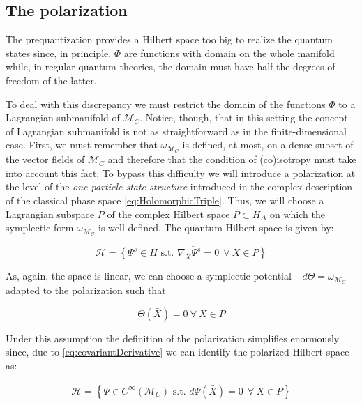 \documentclass[12pt]{article}%
\begin{document}
\subsection{The polarization}

The prequantization provides a Hilbert space too big to realize the quantum states since, in principle, $\Phi$ are functions with domain on the whole manifold while, in regular quantum theories, the domain must have half the degrees of freedom of the latter. 

To deal with this discrepancy we must restrict the domain of the functions $\Phi$ to a Lagrangian submanifold of $\mathcal{M}_{C}$. Notice, though, that in this setting the concept of Lagrangian submanifold is not as straightforward as in the finite-dimensional  case. First, we must remember that $\omega_{\mathcal{M}_C}$ is defined, at most, on a dense subset of the vector fields of  $\mathcal{M}_{C}$ and therefore that the condition of (co)isotropy must take into account this fact. 
 To bypass this difficulty we will introduce a polarization at the level of the \textit{one particle state structure} introduced in the complex description of the classical phase space \eqref{eq:HolomorphicTriple}. Thus, we will choose a Lagrangian subspace $P$ of the complex Hilbert space $P\subset H_{\Delta}$ on which the  symplectic form $\omega_{\mathcal{M}_C}$ is well defined. The quantum Hilbert space is given by:
 
 \begin{equation}
 \label{eq:ponarizedHilbert}
 \mathcal{H}=\overline{\left\{ \Psi^s \in H \textrm{ s.t. } \nabla_{\bar{X}}\Psi^s =0 \ \  \forall\  X\in P\right\}}
 \end{equation}

As, again, the space is linear, we can choose a symplectic potential $-d\Theta=\omega_{\mathcal{M}_C}$ adapted to the polarization such that 

 \begin{equation}
 \label{eq:adaptedPolar}
 \Theta(\bar{X})=0\ \forall \ X\in P
 \end{equation}

Under this assumption the definition of the polarization simplifies enormously since, due to \eqref{eq:covariantDerivative} we can identify the polarized Hilbert space as:

\begin{equation}
\label{eq:quantumFunctions}
\mathcal{H}=\overline{\left\{ \Psi \in C^\infty (\mathcal{M}_C) \textrm{ s.t. } d\Psi(\bar{X}) =0 \ \  \forall\  X\in P\right\}}
\end{equation}
\end{document}
